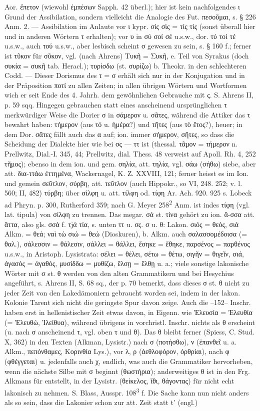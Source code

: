 Aor. ἔπετον (wiewohl ἐμπέσων Sapph. 42 überl.); hier ist kein nachfolgendes ι Grund der Assibilation, sondern vielleicht die Analogie des Fut. πεσοῦμαι, s. § 226 Anm. 2. — Assibilation im Anlaute vor ι kypr. σίς σὶς = τίς τὶς (sonst überall hier und in anderen Wörtern τ erhalten); vor υ in σύ σοί σέ u.s.w., dor. τύ τοί τέ u.s.w., auch  τού u.s.w., aber lesbisch scheint σ gewesen zu sein, s. § 160 f.; ferner ist  τῦκον für σῦκον, vgl. (nach Ahrens) Τυκῆ = Συκῆ, e. Teil von Syrakus (doch συκία = συκῆ tab. Heracl.); τυρίσδω (st. συρίζω) b. Theokr. in den schlechteren Codd. — Dieser Dorismus des τ = σ erhält sich nur in der Konjugation und in der Präposition ποτί zu allen Zeiten; in allen übrigen Wörtern und Wortformen wich er seit Ende des 4. Jahrh. dem gewöhnlichen Gebrauche mit ς. S. Ahrens II, p. 59 sqq. Hingegen gebrauchen statt eines anscheinend ursprünglichen τ merkwürdiger Weise die Dorier σ in σάμερον u. σᾶτες, während die Attiker das τ bewahrt haben: τήμερον (aus τό u. ἡμέρα?) und τῆτες (aus τὸ ἔτος?), heuer; in dem Dor. σᾶτες fällt auch das α auf; ion. immer σήμερον, σῆτες, so dass die Scheidung der Dialekte hier wie bei σς — ττ ist (thessal. τᾶμον = τήμερον n. Prellwitz, Dial.-I. 345, 44; Prellwitz, dial. Thess. 48 verweist auf Apoll. Rh. 4, 252 τῆμος); ebenso in dem ion. und gem. σηλία, att. τηλία, vgl. σάω (σήθω) siebe, aber att. δια-ττάω ἐττημένα, Wackernagel, K. Z. XXVIII, 121; ferner heisst es im Ion. und gemein σεῦτλον, σύρβη, att. τεῦτλον (auch Hippokr., so VI, 248. 252; v. l. 560; II, 482) τύρβη; über σίλφη u. att. τίλφη od. τίφη Ar. Ach. 920. 925 s. Lobeck ad Phryn. p. 300, Rutherford 359; nach G. Meyer 258\textsuperscript{2} Anm. ist indes τίφη (vgl. lat. tipula) von σίλφη zu trennen. Das megar. σά st. τίνα gehört zu ion. ἅ-σσα att. ἅττα, also gls. σσά f. τjά τία, s. unten ττ u. σς. σ u. θ: Lakon. σιός = θεός, σιά Alkm. = θεά; ναὶ τὼ σιώ = θεώ (Dioskuren), b. Alkm. auch σαλασσομέδοισα (= θαλ.), σάλεσσιν = θάλεσιν, σάλλει = θάλλει, ἔσηκε = ἔθηκε, παρσένος = παρθένος u.s.w., in Aristoph. Lysistrata: σέλει = θέλει, σέτω = θέτω, σιγῆν = θιγεῖν, σιά, ἀγασός = ἀγαθός, μυσίδδω = μυθίζω, ἔλσῃ = ἔλθῃ u. a.; viele sonstige lakonische Wörter mit σ st. θ werden von den alten Grammatikern und bei Hesychius angeführt, s. Ahrens II, S. 68 sq., der p. 70 bemerkt, dass dieses σ st. θ nicht zu jeder Zeit von den Lakedämoniern gebraucht worden sei, indem in der lakon. Kolonie Tarent sich nicht die geringste Spur davon zeige. Auch die --152-- Inschr. haben erst in hellenistischer Zeit etwas davon, in Eigenn. wie Ἐλευσία = Ἐλευθία (= Ἐλευθώ, Ἱλείθυα), während übrigens in vorchristl. Inschr. nichts als θ erscheint (u. nach σ anscheinend τ, vgl. oben τ und θ). Das θ bleibt ferner (Spiess, C. Stud. X, 362) in den Texten (Alkman, Lysistr.) nach σ (ποτήσθω), ν (ἐπανθεῖ u. a. Alkm., πεπόνθαμες, Κορινθία Lys.), vor λ, ρ (ἀεθλοφόρον, ὀρθρίαι), nach φ (φθέγγεται) u. jedenfalls auch χ, endlich, was auch die Grammatiker hervorheben, wenn die nächste Silbe mit σ beginnt (θωστήρια); anderweitiges θ ist in den Frg. Alkmans für entstellt, in der Lysistr. (θείκελος, ἴθι, θάγοντας) für nicht echt lakonisch zu nehmen. S. Blass, Ausspr. 108\textsuperscript{3} f. Die Sache kann nun nicht anders als so sein, dass die Lakonier schon zur att. Zeit statt t' (engl.) 